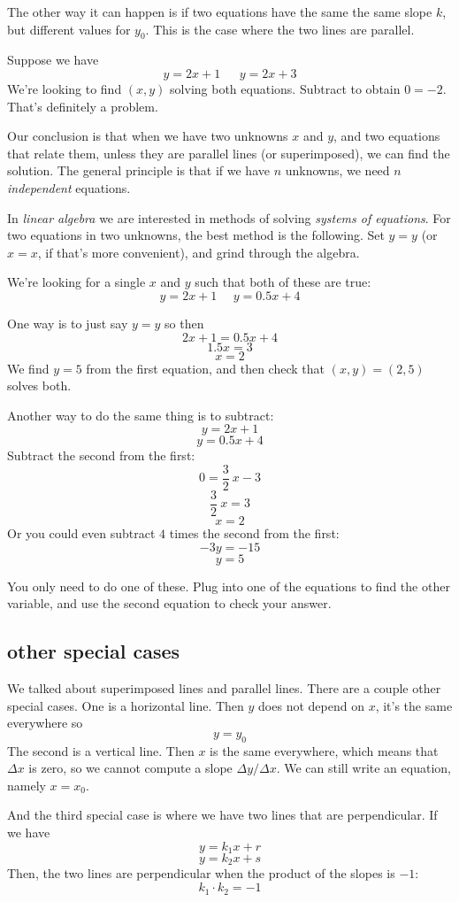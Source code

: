 \documentclass[11pt, oneside]{article}
\begin{document}
The other way it can happen is if two equations have the same the same slope $k$, but different values for $y_0$.  This is the case where the two lines are parallel.

Suppose we have
\[ y = 2x + 1 \ \ \ \ \ \ \ y = 2x + 3 \]
We're looking to find $(x,y)$ solving both equations.  Subtract to obtain $0  = -2$.  That's definitely a problem.

Our conclusion is that when we have two unknowns $x$ and $y$, and two equations that relate them, unless they are parallel lines (or superimposed), we can find the solution.  The general principle is that if we have $n$ unknowns, we need $n$ \emph{independent} equations.

In \emph{linear algebra} we are interested in methods of solving \emph{systems of equations}.  For two equations in two unknowns, the best method is the following.  Set $y = y$ (or $x = x$, if that's more convenient), and grind through the algebra.

We're looking for a single $x$ and $y$ such that both of these are true:
\[ y = 2x + 1 \ \ \ \ \ \ y = 0.5x + 4 \]

One way is to just say $y = y$ so then
\[ 2x + 1 = 0.5x + 4 \]
\[ 1.5x = 3 \]
\[ x = 2 \]
We find $y = 5$ from the first equation, and then check that $(x,y) = (2,5)$ solves both.

Another way to do the same thing is to subtract:
\[ y = 2x + 1 \]
\[ y = 0.5x + 4 \]
Subtract the second from the first:
\[ 0 = \frac{3}{2} \ x - 3 \]
\[ \frac{3}{2} \ x = 3 \]
\[ x = 2 \]
Or you could even subtract $4$ times the second from the first:
\[ -3y = -15 \]
\[ y = 5 \]

You only need to do one of these.  Plug into one of the equations to find the other variable, and use the second equation to check your answer.

\subsection*{other special cases}
We talked about superimposed lines and parallel lines.  There are a couple other special cases.  One is a horizontal line.  Then $y$ does not depend on $x$, it's the same everywhere so
\[ y = y_0 \]
The second is a vertical line.  Then $x$ is the same everywhere, which means that $\Delta x$ is zero, so we cannot compute a slope $\Delta y / \Delta x$.
We can still write an equation, namely $x = x_0$.

And the third special case is where we have two lines that are perpendicular.  If we have
\[ y = k_1 x + r \]
\[ y = k_2 x + s \]
Then, the two lines are perpendicular when the product of the slopes is $-1$:
\[ k_1 \cdot k_2 = -1 \]
\end{document}
